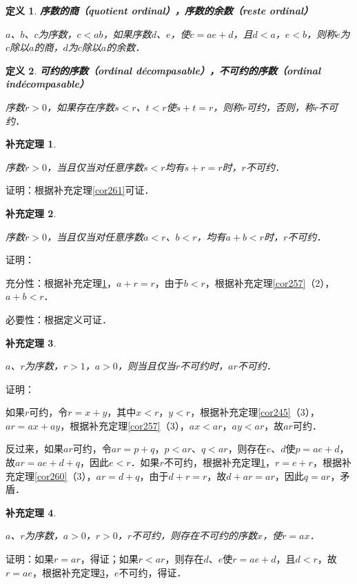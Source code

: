 \documentclass[12pt, a4paper, oneside]{book}
\newtheorem{cor}{补充定理}
\newtheorem{de}{定义}
\begin{document}
			\begin{de}
				\textbf{序数的商（quotient ordinal），序数的余数（reste ordinal）}
				\par
				$a$、$b$、$c$为序数，$c<ab$，如果序数$d$、$e$，使$c=ae+d$，且$d<a$，$e<b$，则称$e$为$c$除以$a$的商，$d$为$c$除以$a$的余数．
			\end{de}
									
			\begin{de}
				\textbf{可约的序数（ordinal décompasable），不可约的序数（ordinal \\indécompasable）}
				\par
				序数$r>0$，如果存在序数$s<r$、$t<r$使$s+t=r$，则称$r$可约，否则，称$r$不可约．
			\end{de}
			
			\begin{cor}\label{cor263}
				\hfill\par
				序数$r>0$，当且仅当对任意序数$s<r$均有$s+r=r$时，$r$不可约．	
			\end{cor}
			证明：根据补充定理\ref{cor261}可证．
			
			\begin{cor}\label{cor264}
				\hfill\par
				序数$r>0$，当且仅当对任意序数$a<r$、$b<r$，均有$a+b<r$时，$r$不可约．
			\end{cor}
			证明：
			\par
			充分性：根据补充定理\ref{cor263}，$a+r=r$，由于$b<r$，根据补充定理\ref{cor257}（2），$a+b<r$．
			\par
			必要性：根据定义可证．
			
			\begin{cor}\label{cor265}
				\hfill\par
				$a$、$r$为序数，$r>1$，$a>0$，则当且仅当$r$不可约时，$ar$不可约．
			\end{cor}
			证明：
			\par
			如果$r$可约，令$r=x+y$，其中$x<r$，$y<r$，根据补充定理\ref{cor245}（3），$ar=ax+ay$，根据补充定理\ref{cor257}（3），$ax<ar$，$ay<ar$，故$ar$可约．
			\par
			反过来，如果$ar$可约，令$ar=p+q$，$p<ar$、$q<ar$，则存在$e$、$d$使$p=ae+d$，故$ar=ae+d+q$，因此$e<r$．如果$r$不可约，根据补充定理\ref{cor263}，$r=e+r$，根据补充定理\ref{cor260}（3），$ar=d+q$，由于$d+r=r$，故$d+ar=ar$，因此$q=ar$，矛盾．
			
			\begin{cor}\label{cor266}
				\hfill\par
				$a$、$r$为序数，$a>0$，$r>0$，$r$不可约，则存在不可约的序数$x$，使$r=ax$．
			\end{cor}
			证明：如果$r=ar$，得证；如果$r<ar$，则存在$d$、$e$使$r=ae+d$，且$d<r$，故$r=ae$，根据补充定理\ref{cor265}，$e$不可约，得证．
			
\end{document}
